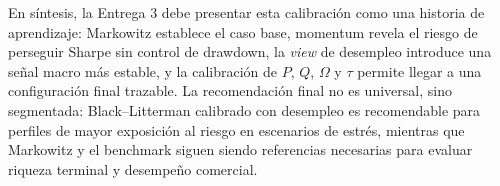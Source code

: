 \documentclass[11pt]{article}
\begin{document}
En s\'intesis, la Entrega 3 debe presentar esta calibraci\'on como una historia de aprendizaje: Markowitz establece el caso base, momentum revela el riesgo de perseguir Sharpe sin control de drawdown, la \textit{view} de desempleo introduce una se\~nal macro m\'as estable, y la calibraci\'on de $P$, $Q$, $\Omega$ y $\tau$ permite llegar a una configuraci\'on final trazable. La recomendaci\'on final no es universal, sino segmentada: Black--Litterman calibrado con desempleo es recomendable para perfiles de mayor exposici\'on al riesgo en escenarios de estr\'es, mientras que Markowitz y el benchmark siguen siendo referencias necesarias para evaluar riqueza terminal y desempe\~no comercial.
\end{document}
